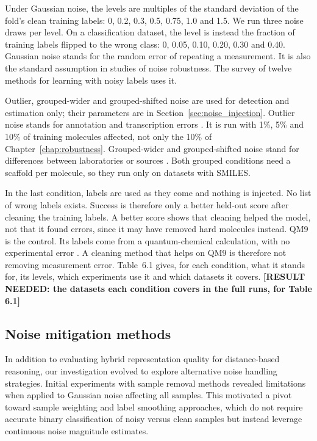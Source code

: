 Under Gaussian noise, the levels are multiples of the standard deviation of the fold's clean training labels: 0, 0.2, 0.3, 0.5, 0.75, 1.0 and 1.5. We run three noise draws per level. On a classification dataset, the level is instead the fraction of training labels flipped to the wrong class: 0, 0.05, 0.10, 0.20, 0.30 and 0.40. Gaussian noise stands for the random error of repeating a measurement. It is also the standard assumption in studies of noise robustness. The survey of twelve methods for learning with noisy labels uses it.

Outlier, grouped-wider and grouped-shifted noise are used for detection and estimation only; their parameters are in Section~\ref{sec:noise_injection}. Outlier noise stands for annotation and transcription errors \citep{Kalliokoski2013, Hampel2001}. It is run with 1\%, 5\% and 10\% of training molecules affected, not only the 10\% of Chapter~\ref{chap:robustness}. Grouped-wider and grouped-shifted noise stand for differences between laboratories or sources \citep{Bentz2013}. Both grouped conditions need a scaffold per molecule, so they run only on datasets with SMILES.

In the last condition, labels are used as they come and nothing is injected. No list of wrong labels exists. Success is therefore only a better held-out score after cleaning the training labels. A better score shows that cleaning helped the model, not that it found errors, since it may have removed hard molecules instead. QM9 is the control. Its labels come from a quantum-chemical calculation, with no experimental error \citep{Ramakrishnan2014}. A cleaning method that helps on QM9 is therefore not removing measurement error. Table~6.1 gives, for each condition, what it stands for, its levels, which experiments use it and which datasets it covers. \textbf{[RESULT NEEDED: the datasets each condition covers in the full runs, for Table 6.1]}



\subsection{Noise mitigation methods}

In addition to evaluating hybrid representation quality for distance-based reasoning, our investigation evolved to explore alternative noise handling strategies. Initial experiments with sample removal methods revealed limitations when applied to Gaussian noise affecting all samples. This motivated a pivot toward sample weighting and label smoothing approaches, which do not require accurate binary classification of noisy versus clean samples but instead leverage continuous noise magnitude estimates.

